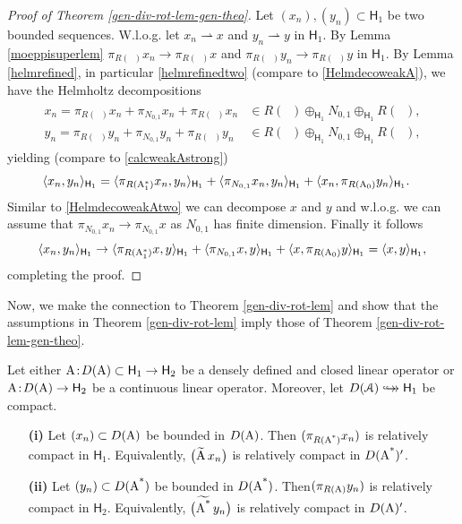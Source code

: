 \documentclass[a4paper]{amsart}
\newcommand{\wto}{\rightharpoonup}
\renewcommand{\H}{\mathsf{H}}
\DeclareMathOperator{\Az}{A_{0}}
\DeclareMathOperator{\Aos}{A_{1}^{*}}
\newcommand{\cptemb}{\hookto\hspace*{-0.85em}\hookto}
\begin{document}
\begin{proof}[Proof of Theorem \ref{gen-div-rot-lem-gen-theo}]
Let $(x_{n}),(y_{n})\subset\H_{1}$ be two bounded sequences.
W.l.o.g. let $x_{n}\wto x$ and $y_{n}\wto y$ in $\H_{1}$.
By Lemma \ref{moeppisuperlem} 
$\pi_{R(\Aos)}x_{n}\to\pi_{R(\Aos)}x$
and $\pi_{R(\Az)}y_{n}\to\pi_{R(\Az)}y$ in $\H_{1}$.
By Lemma \ref{helmrefined}, in particular \eqref{helmrefinedtwo} (compare to \eqref{HelmdecoweakA}),
we have the Helmholtz decompositions
\begin{align}
\label{HelmdecoweakAtwo}
\begin{split}
x_{n}=\pi_{R(\Az)}x_{n}+\pi_{N_{0,1}}x_{n}+\pi_{R(\Aos)}x_{n}&\in R(\Az)\oplus_{\H_{1}}N_{0,1}\oplus_{\H_{1}}R(\Aos),\\
y_{n}=\pi_{R(\Az)}y_{n}+\pi_{N_{0,1}}y_{n}+\pi_{R(\Aos)}y_{n}&\in R(\Az)\oplus_{\H_{1}}N_{0,1}\oplus_{\H_{1}}R(\Aos),
\end{split}
\end{align}
yielding (compare to \eqref{calcweakAstrong})
\begin{align}
\label{calcweakA}
\scp{x_{n}}{y_{n}}_{\H_{1}}
&=\scp{\pi_{R(\Aos)}x_{n}}{y_{n}}_{\H_{1}}
+\scp{\pi_{N_{0,1}}x_{n}}{y_{n}}_{\H_{1}}
+\scp{x_{n}}{\pi_{R(\Az)}y_{n}}_{\H_{1}}.
\end{align}
Similar to \eqref{HelmdecoweakAtwo} we can decompose $x$ and $y$
and w.l.o.g. we can assume that $\pi_{N_{0,1}}x_{n}\to\pi_{N_{0,1}}x$
as $N_{0,1}$ has finite dimension. Finally it follows
$$\scp{x_{n}}{y_{n}}_{\H_{1}}
\to\scp{\pi_{R(\Aos)}x}{y}_{\H_{1}}
+\scp{\pi_{N_{0,1}}x}{y}_{\H_{1}}
+\scp{x}{\pi_{R(\Az)}y}_{\H_{1}}
=\scp{x}{y}_{\H_{1}},$$
completing the proof.
\end{proof}

Now, we make the connection to Theorem \ref{gen-div-rot-lem}
and show that the assumptions in Theorem \ref{gen-div-rot-lem}
imply those of Theorem \ref{gen-div-rot-lem-gen-theo}.

\begin{lem}
Let either $\A\!:\!D(\A)\subset\H_{1}\to\H_{2}$ be a densely defined and closed linear operator
or $\A\!:\!D(\A)\to\H_{2}$ be a continuous linear operator.
Moreover, let $D(\cA)\cptemb\H_{1}$ be compact.
\begin{itemize}
\item[\bf(i)]
Let $(x_{n})\subset D(\operatorname{A})$ be bounded in $D(\operatorname{A})$.
Then $(\pi_{R(\operatorname{\operatorname{A}^{*}})}x_{n})$ is relatively compact in $\H_{1}$.
Equivalently, $\big(\widetilde{\operatorname{A}}\,x_{n}\big)$ is relatively compact in $D(\operatorname{\operatorname{A}^{*}})'$.
\item[\bf(ii)]
Let $(y_{n})\subset D(\operatorname{\operatorname{A}^{*}})$ be bounded in $D(\operatorname{\operatorname{A}^{*}})$.
Then$(\pi_{R(\operatorname{A})}y_{n})$ is relatively compact in $\H_{2}$.
Equivalently, $\big(\widetilde{\operatorname{\operatorname{A}^{*}}}\,y_{n}\big)$ is relatively compact in $D(\operatorname{A})'$.
\end{itemize}
\end{lem}
\end{document}
